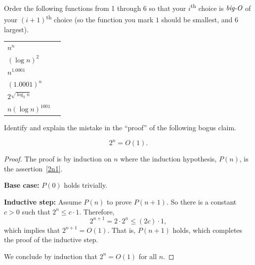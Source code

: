 \documentclass[12pt]{article}
\begin{document}
\begin{problem}{10}
\bparts

\newcommand{\longline}{\underline{\hspace{5cm}}}

Order the following functions from 1 through 6 so that your $i$\textsuperscript{th} choice is $\emph{big-O}$ of your $(i+1)$\textsuperscript{th} choice (so the function you mark $1$ should be smallest, and 6 largest).

\bigskip

\renewcommand{\arraystretch}{3}
\begin{tabular}{ll}
    $n^n$ & \longline \\
$(\log n)^2$ & \longline \\
$n^{1.0001}$ & \longline \\
$(1.0001)^n$ & \longline \\
$2^{\sqrt{\log_2n}}$ & \longline \\
 $n(\log n)^{1001}$  & \longline \\
\end{tabular}
\renewcommand{\arraystretch}{1}

\newpage

 Identify and explain the mistake in
the ``proof'' of the following bogus claim.
\begin{falseclm*}
\begin{equation}\label{2n1}
2^n = O(1).
\end{equation}
\end{falseclm*}

\begin{proof}
The proof is by induction on $n$ where the induction 
hypothesis, $P(n)$, is the assertion~\eqref{2n1}.

{\bf Base case:}  $P(0)$ holds trivially.

{\bf Inductive step:} Assume $P(n)$ to prove $P(n+1)$. So there is a constant $c >0$
such that $2^n \leq c \cdot 1$.  Therefore,
\[
2^{n+1} = 2 \cdot 2^n \leq (2c) \cdot 1,
\]
which implies that $2^{n+1} = O(1)$.  That is, $P(n+1)$ holds, which
completes the proof of the inductive step.

We conclude by induction that $2^n = O(1)$ for all $n$.  
\end{proof}
\eparts

\end{problem}
\end{document}
